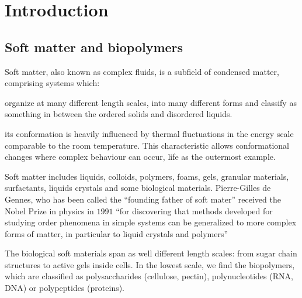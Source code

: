 
\chapter{Introduction} %

\label{Introduction} %



    
    

\section{Soft matter and biopolymers}
Soft matter, also known as complex fluids, is a subfield of condensed
matter, comprising systems which:
\begin{enumerate*}[label=\bfseries\alph*)]
 
\item organize at many different length scales, into
many different forms and classify as something in between the
ordered solids and disordered liquids.\
\item its conformation is heavily
influenced by thermal fluctuations in the energy scale comparable to the room
temperature. This characteristic allows conformational changes where complex
behaviour can occur, life as the outermost example.
\end{enumerate*}

Soft matter includes liquids, colloids, polymers, foams, gels, granular
materials, surfactants, liquids crystals and some biological materials.
Pierre-Gilles de Gennes, who has been called the ``founding father of soft
mater'' received the Nobel Prize in physics in $1991$ ``for discovering that 
methods developed for studying order phenomena in simple systems can be 
generalized to more complex forms of matter, in particular to liquid  crystals
and polymers''\citep{de_gennes_pierre-gilles_????}
 
The biological soft materials span as well different length scales: from sugar
chain structures to active gels inside cells. In the
lowest scale, we find the biopolymers, which are classified as polysaccharides
(cellulose, pectin),  polynucleotides (RNA, DNA) or polypeptides (proteins).
 
